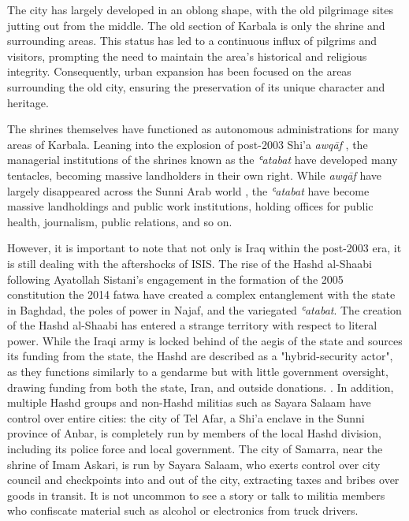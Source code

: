 The city has largely developed in an oblong shape, with the old pilgrimage sites jutting out from the middle. The old section of Karbala is only the shrine and surrounding areas. This status has led to a continuous influx of pilgrims and visitors, prompting the need to maintain the area's historical and religious integrity. Consequently, urban expansion has been focused on the areas surrounding the old city, ensuring the preservation of its unique character and heritage.

The shrines themselves have functioned as autonomous administrations for many areas of Karbala. Leaning into the explosion of post-2003 Shi'a \emph{awqāf} \cite{hamdan_development_2012}, the managerial institutions of the shrines known as the \emph{ʿatabat}  have developed many tentacles, becoming massive landholders in their own right. While \emph{awqāf} have largely disappeared across the Sunni Arab world \cite{moumtaz_gods_2021}, the \emph{ʿatabat}  have become massive landholdings and public work institutions, holding offices for public health, journalism, public relations, and so on. 

However, it is important to note that not only is Iraq within the post-2003 era, it is still dealing with the aftershocks of ISIS. The rise of the Hashd al-Shaabi following Ayatollah Sistani's engagement in the formation of the 2005 constitution \cite{al-rahim_sistani_2005} the 2014 fatwa \cite{rudolf_battlefield_2018}\cite{ann_wainscott_engaging_2019} have created a complex entanglement with the state in Baghdad, the poles of power in Najaf, and the variegated \emph{ʿatabat}. The creation of the Hashd al-Shaabi has entered a strange territory with respect to literal power. While the Iraqi army is locked behind of the aegis of the state and sources its funding from the state, the Hashd are described as a "hybrid-security actor", as they functions similarly to a gendarme but with little government oversight, drawing funding from both the state, Iran, and outside donations.\cite{cambanis_hybrid_2019} \cite{renad_mansour_popular_2018}. In addition, multiple Hashd groups and non-Hashd militias such as Sayara Salaam have control over entire cities: the city of Tel Afar, a Shi'a enclave in the Sunni province of Anbar, is completely run by members of the local Hashd division, including its police force and local government. The city of Samarra, near the shrine of Imam Askari, is run by Sayara Salaam, who exerts control over city council and checkpoints into and out of the city, extracting taxes and bribes over goods in transit. It is not uncommon to see a story or talk to militia members who confiscate material such as alcohol or electronics from truck drivers. 

